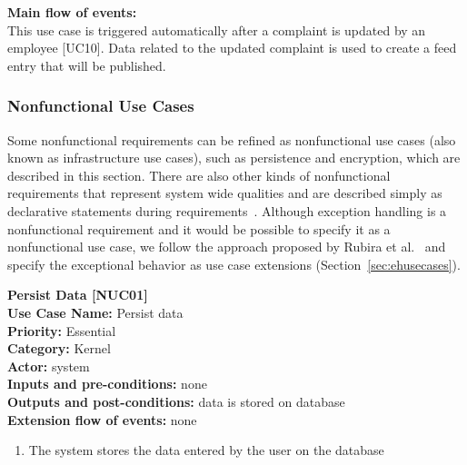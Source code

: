 \documentclass[11pt,twoside]{article}
\begin{document}
\textbf{Main flow of events:}\\
This use case is triggered automatically after a complaint is updated by an employee [UC10]. Data related to the updated complaint is
used to create a feed entry that will be published. 

\subsubsection{Nonfunctional Use Cases}
\label{sec:nonfunctionalUsecases}
Some nonfunctional requirements can be refined as nonfunctional use cases (also known as infrastructure use cases), such as persistence and
encryption, which are described in this
section. There are also other kinds of nonfunctional requirements that represent system wide qualities and are described simply as
declarative statements during requirements~\cite[Chapter 7.3]{Jacobson:2004:ASD}. Although exception handling is a nonfunctional requirement
and it would be possible to specify it as a nonfunctional use case, we follow the approach proposed by Rubira et al.~\cite{Rubira:2005:EHD}
and specify the exceptional behavior as use case extensions (Section~\ref{sec:ehusecases}).

\textbf{Persist Data [NUC01]}\\
\textbf{Use Case Name:} Persist data\\
\textbf{Priority:} Essential  \\ 
\textbf{Category:} Kernel \\ 
\textbf{Actor:} system\\
\textbf{Inputs and pre-conditions:} none\\ 
\textbf{Outputs and post-conditions:} data is stored on database \\  
\textbf{Extension flow of events:} none\\
\begin{enumerate}
\item The system stores the data entered by the user on the database
\end{enumerate}
\end{document}
